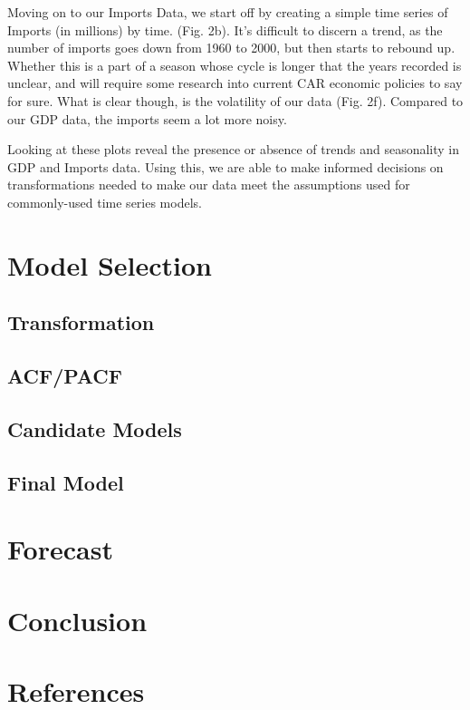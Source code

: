 \documentclass[11pt]{article}
\begin{document}
Moving on to our Imports Data, we start off by creating a simple time series of Imports (in millions) by time. (Fig. 2b). It's difficult to discern a trend, as the number of imports goes down from 1960 to 2000, but then starts to rebound up. Whether this is a part of a season whose cycle is longer that the years recorded is unclear, and will require some research into current CAR economic policies to say for sure. What is clear though, is the volatility of our data (Fig. 2f). Compared to our GDP data, the imports seem a lot more noisy.

Looking at these plots reveal the presence or absence of trends and seasonality in GDP and Imports data. Using this, we are able to make informed decisions on transformations needed to make our data meet the assumptions used for commonly-used time series models.



\section{Model Selection}
\subsection{Transformation}
\subsection{ACF/PACF}
\subsection{Candidate Models}
\subsection{Final Model}

\section{Forecast}

\section{Conclusion}

\newpage

\section{References}
\end{document}
